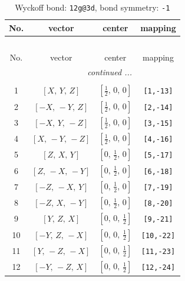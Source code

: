 \documentclass[fleqn,8pt]{jsarticle}
\begin{document}
\begin{longtable}{cccc}
\caption{Wyckoff bond: {\tt 12g@3d}, bond symmetry: {\tt -1}}
 \\
 \hline \hline
No. & vector & center & mapping \\ \hline \endfirsthead

\multicolumn{3}{l}{\tablename\ \thetable{}} \\
 \hline \hline
No. & vector & center & mapping \\ \hline \endhead

 \hline \hline
\multicolumn{3}{r}{\footnotesize\it continued ...} \\ \endfoot

 \hline \hline
\multicolumn{3}{r}{} \\ \endlastfoot

1 & $\left[ X,\, Y,\, Z \right]$ & $\left[ \frac{1}{2},\, 0,\, 0 \right]$ & {\tt [1,-13]} \\ \hline
2 & $\left[ - X,\, - Y,\, Z \right]$ & $\left[ \frac{1}{2},\, 0,\, 0 \right]$ & {\tt [2,-14]} \\ \hline
3 & $\left[ - X,\, Y,\, - Z \right]$ & $\left[ \frac{1}{2},\, 0,\, 0 \right]$ & {\tt [3,-15]} \\ \hline
4 & $\left[ X,\, - Y,\, - Z \right]$ & $\left[ \frac{1}{2},\, 0,\, 0 \right]$ & {\tt [4,-16]} \\ \hline
5 & $\left[ Z,\, X,\, Y \right]$ & $\left[ 0,\, \frac{1}{2},\, 0 \right]$ & {\tt [5,-17]} \\ \hline
6 & $\left[ Z,\, - X,\, - Y \right]$ & $\left[ 0,\, \frac{1}{2},\, 0 \right]$ & {\tt [6,-18]} \\ \hline
7 & $\left[ - Z,\, - X,\, Y \right]$ & $\left[ 0,\, \frac{1}{2},\, 0 \right]$ & {\tt [7,-19]} \\ \hline
8 & $\left[ - Z,\, X,\, - Y \right]$ & $\left[ 0,\, \frac{1}{2},\, 0 \right]$ & {\tt [8,-20]} \\ \hline
9 & $\left[ Y,\, Z,\, X \right]$ & $\left[ 0,\, 0,\, \frac{1}{2} \right]$ & {\tt [9,-21]} \\ \hline
10 & $\left[ - Y,\, Z,\, - X \right]$ & $\left[ 0,\, 0,\, \frac{1}{2} \right]$ & {\tt [10,-22]} \\ \hline
11 & $\left[ Y,\, - Z,\, - X \right]$ & $\left[ 0,\, 0,\, \frac{1}{2} \right]$ & {\tt [11,-23]} \\ \hline
12 & $\left[ - Y,\, - Z,\, X \right]$ & $\left[ 0,\, 0,\, \frac{1}{2} \right]$ & {\tt [12,-24]} \\
\end{longtable}
\end{document}
